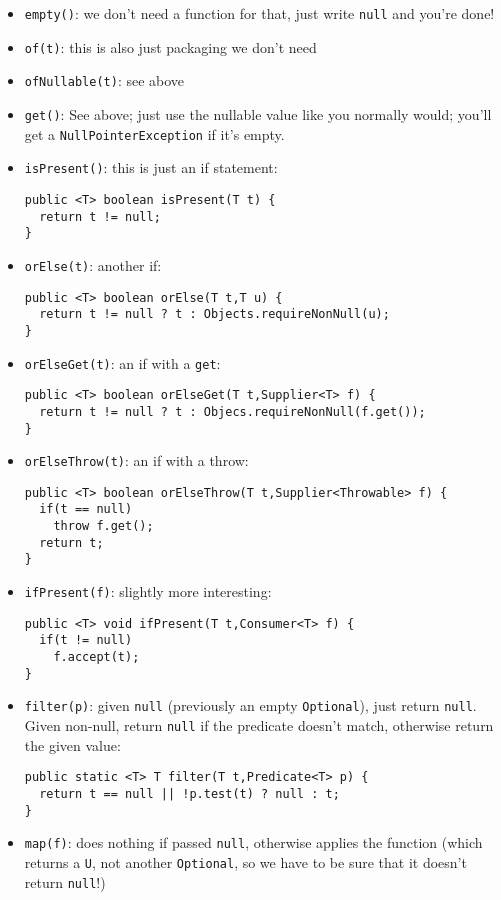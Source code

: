 \documentclass[11pt]{article}
\begin{document}
\begin{itemize}
\item \texttt{empty()}: we don't need a function for that, just write \texttt{null} and you're done!
\item \texttt{of(t)}: this is also just packaging we don't need
\item \texttt{ofNullable(t)}: see above
\item \texttt{get()}: See above; just use the nullable value like you normally would; you'll get a \texttt{NullPointerException} if it's empty.
\item \texttt{isPresent()}: this is just an if statement:
\begin{verbatim}
public <T> boolean isPresent(T t) {
  return t != null;
}
\end{verbatim}
\item \texttt{orElse(t)}: another if:
\begin{verbatim}
public <T> boolean orElse(T t,T u) {
  return t != null ? t : Objects.requireNonNull(u);
}
\end{verbatim}
\item \texttt{orElseGet(t)}: an if with a \texttt{get}:
\begin{verbatim}
public <T> boolean orElseGet(T t,Supplier<T> f) {
  return t != null ? t : Objecs.requireNonNull(f.get());
}
\end{verbatim}
\item \texttt{orElseThrow(t)}: an if with a throw:
\begin{verbatim}
public <T> boolean orElseThrow(T t,Supplier<Throwable> f) {
  if(t == null)
    throw f.get();
  return t;
}
\end{verbatim}
\item \texttt{ifPresent(f)}: slightly more interesting:
\begin{verbatim}
public <T> void ifPresent(T t,Consumer<T> f) {
  if(t != null)
    f.accept(t);
}
\end{verbatim}
\item \texttt{filter(p)}: given \texttt{null} (previously an empty \texttt{Optional}), just return \texttt{null}. Given non-null, return \texttt{null} if the predicate doesn't match, otherwise return the given value:
\begin{verbatim}
public static <T> T filter(T t,Predicate<T> p) {
  return t == null || !p.test(t) ? null : t;
}
\end{verbatim}
\item \texttt{map(f)}: does nothing if passed \texttt{null}, otherwise applies the function (which returns a \texttt{U}, not another \texttt{Optional}, so we have to be sure that it doesn't return \texttt{null}!)

\end{itemize}
\end{document}
